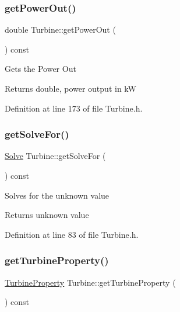 \mbox{\label{class_turbine_a89585cc2fbfdbe67d539eae08c369fa2}} 
\subsubsection{\texorpdfstring{get\+Power\+Out()}{getPowerOut()}}
{\footnotesize\ttfamily double Turbine\+::get\+Power\+Out (\begin{DoxyParamCaption}{ }\end{DoxyParamCaption}) const\hspace{0.3cm}{\ttfamily [inline]}}

Gets the Power Out

\begin{DoxyReturn}{Returns}
double, power output in kW 
\end{DoxyReturn}


Definition at line 173 of file Turbine.\+h.

\mbox{\label{class_turbine_a58c73057a4b890eab2af2b42c82484e6}} 
\subsubsection{\texorpdfstring{get\+Solve\+For()}{getSolveFor()}}
{\footnotesize\ttfamily \hyperlink{class_turbine_a9fd7beba6c6f071e228fbe3e07969d2b}{Solve} Turbine\+::get\+Solve\+For (\begin{DoxyParamCaption}{ }\end{DoxyParamCaption}) const\hspace{0.3cm}{\ttfamily [inline]}}

Solves for the unknown value

\begin{DoxyReturn}{Returns}
unknown value 
\end{DoxyReturn}


Definition at line 83 of file Turbine.\+h.

\mbox{\label{class_turbine_a14f6eff49b501aa8c5a22d404dbeaac0}} 
\subsubsection{\texorpdfstring{get\+Turbine\+Property()}{getTurbineProperty()}}
{\footnotesize\ttfamily \hyperlink{class_turbine_a5db4f65cf2539e3837684d53221ade12}{Turbine\+Property} Turbine\+::get\+Turbine\+Property (\begin{DoxyParamCaption}{ }\end{DoxyParamCaption}) const\hspace{0.3cm}{\ttfamily [inline]}}

